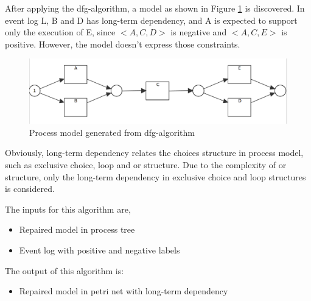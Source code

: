 \documentclass[]{article}
\begin{document}
After applying the dfg-algorithm, a model as shown in Figure \ref{fig:pn_without_lt_exm01} is discovered. In event log L, B and D has long-term dependency, and A is expected to support only the execution of E, since $<A,C,D>$ is negative and $<A,C,E>$ is positive. However, the model doesn't express those constraints.
\begin{figure}[h!]
	\includegraphics[width=\textwidth]{PN06_Seq_2_xor_notnested.png}
	\caption{Process model generated from dfg-algorithm}
	\label{fig:pn_without_lt_exm01}
\end{figure}
Obviously, long-term dependency relates the choices structure in process model, such as exclusive choice, loop and or structure. Due to the complexity of or structure, only the long-term dependency in exclusive choice and loop structures is considered. 

The inputs for this algorithm are,
\begin{itemize}
	\item Repaired model in process tree
	\item Event log with positive and negative labels
\end{itemize}
The output of this algorithm is: 
\begin{itemize}
	\item Repaired model in petri net with long-term dependency
\end{itemize}
\end{document}
